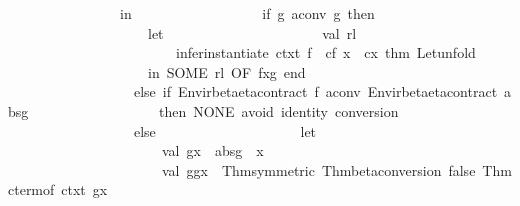 \begin{isabellebody}
\ \ \ \ \ \ \ \ \ \ \ \ \ \ \ \ in\isanewline
\ \ \ \ \ \ \ \ \ \ \ \ \ \ \ \ \ \ if\ g\ aconv\ g{\isacharprime}{\kern0pt}\ then\isanewline
\ \ \ \ \ \ \ \ \ \ \ \ \ \ \ \ \ \ \ \ let\isanewline
\ \ \ \ \ \ \ \ \ \ \ \ \ \ \ \ \ \ \ \ \ \ val\ rl\ {\isacharequal}{\kern0pt}\isanewline
\ \ \ \ \ \ \ \ \ \ \ \ \ \ \ \ \ \ \ \ \ \ \ \ infer{\isacharunderscore}{\kern0pt}instantiate\ ctxt\ {\isacharbrackleft}{\kern0pt}{\isacharparenleft}{\kern0pt}{\isacharparenleft}{\kern0pt}{\isachardoublequote}{\kern0pt}f{\isachardoublequote}{\kern0pt}{\isacharcomma}{\kern0pt}\ {}{\isacharparenright}{\kern0pt}{\isacharcomma}{\kern0pt}\ cf{\isacharparenright}{\kern0pt}{\isacharcomma}{\kern0pt}\ {\isacharparenleft}{\kern0pt}{\isacharparenleft}{\kern0pt}{\isachardoublequote}{\kern0pt}x{\isachardoublequote}{\kern0pt}{\isacharcomma}{\kern0pt}\ {}{\isacharparenright}{\kern0pt}{\isacharcomma}{\kern0pt}\ cx{\isacharparenright}{\kern0pt}{\isacharbrackright}{\kern0pt}\ {\isacharat}{\kern0pt}{\isacharbraceleft}{\kern0pt}thm\ Let{\isacharunderscore}{\kern0pt}unfold{\isacharbraceright}{\kern0pt}{\isacharsemicolon}{\kern0pt}\isanewline
\ \ \ \ \ \ \ \ \ \ \ \ \ \ \ \ \ \ \ \ in\ SOME\ {\isacharparenleft}{\kern0pt}rl\ OF\ {\isacharbrackleft}{\kern0pt}fx{\isacharunderscore}{\kern0pt}g{\isacharbrackright}{\kern0pt}{\isacharparenright}{\kern0pt}\ end\isanewline
\ \ \ \ \ \ \ \ \ \ \ \ \ \ \ \ \ \ else\ if\ {\isacharparenleft}{\kern0pt}Envir{\isachardot}{\kern0pt}beta{\isacharunderscore}{\kern0pt}eta{\isacharunderscore}{\kern0pt}contract\ f{\isacharparenright}{\kern0pt}\ aconv\ {\isacharparenleft}{\kern0pt}Envir{\isachardot}{\kern0pt}beta{\isacharunderscore}{\kern0pt}eta{\isacharunderscore}{\kern0pt}contract\ abs{\isacharunderscore}{\kern0pt}g{\isacharprime}{\kern0pt}{\isacharparenright}{\kern0pt}\isanewline
\ \ \ \ \ \ \ \ \ \ \ \ \ \ \ \ \ \ then\ NONE\ {\isacharparenleft}{\kern0pt}{\isacharasterisk}{\kern0pt}avoid\ identity\ conversion{\isacharasterisk}{\kern0pt}{\isacharparenright}{\kern0pt}\isanewline
\ \ \ \ \ \ \ \ \ \ \ \ \ \ \ \ \ \ else\isanewline
\ \ \ \ \ \ \ \ \ \ \ \ \ \ \ \ \ \ \ \ let\isanewline
\ \ \ \ \ \ \ \ \ \ \ \ \ \ \ \ \ \ \ \ \ \ val\ g{\isacharprime}{\kern0pt}x\ {\isacharequal}{\kern0pt}\ abs{\isacharunderscore}{\kern0pt}g{\isacharprime}{\kern0pt}\ {\isachardollar}{\kern0pt}\ x{\isacharsemicolon}{\kern0pt}\isanewline
\ \ \ \ \ \ \ \ \ \ \ \ \ \ \ \ \ \ \ \ \ \ val\ g{\isacharunderscore}{\kern0pt}g{\isacharprime}{\kern0pt}x\ {\isacharequal}{\kern0pt}\ Thm{\isachardot}{\kern0pt}symmetric\ {\isacharparenleft}{\kern0pt}Thm{\isachardot}{\kern0pt}beta{\isacharunderscore}{\kern0pt}conversion\ false\ {\isacharparenleft}{\kern0pt}Thm{\isachardot}{\kern0pt}cterm{\isacharunderscore}{\kern0pt}of\ ctxt\ g{\isacharprime}{\kern0pt}x{\isacharparenright}{\kern0pt}{\isacharparenright}{\kern0pt}{\isacharsemicolon}{\kern0pt}\isanewline

\end{isabellebody}
